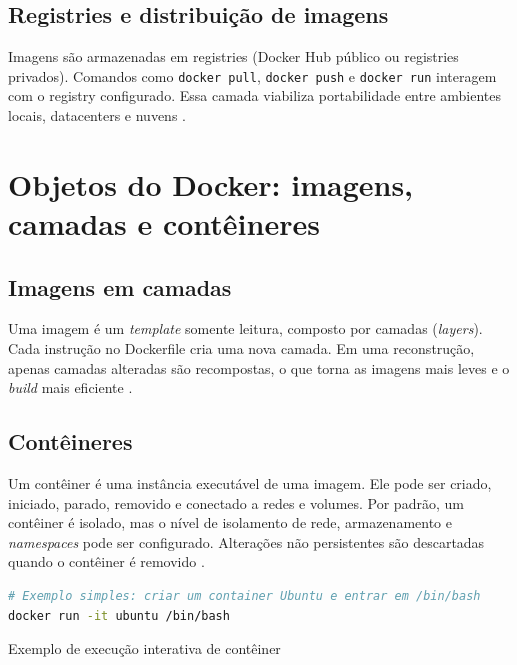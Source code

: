 \subsection{Registries e distribuição de imagens}
\label{subsec:docker-registries}

Imagens são armazenadas em registries (Docker Hub público ou registries privados). Comandos como \texttt{docker pull}, \texttt{docker push} e \texttt{docker run} interagem com o registry configurado. Essa camada viabiliza portabilidade entre ambientes locais, datacenters e nuvens \cite{docker_overview}. 

\section{Objetos do Docker: imagens, camadas e contêineres}
\label{sec:docker-objetos}

\subsection{Imagens em camadas}
\label{subsec:docker-imagens}

Uma imagem é um \textit{template} somente leitura, composto por camadas (\textit{layers}). Cada instrução no Dockerfile cria uma nova camada. Em uma reconstrução, apenas camadas alteradas são recompostas, o que torna as imagens mais leves e o \textit{build} mais eficiente \cite{docker_overview}. 

\subsection{Contêineres}
\label{subsec:docker-containers}

Um contêiner é uma instância executável de uma imagem. Ele pode ser criado, iniciado, parado, removido e conectado a redes e volumes. Por padrão, um contêiner é isolado, mas o nível de isolamento de rede, armazenamento e \textit{namespaces} pode ser configurado. Alterações não persistentes são descartadas quando o contêiner é removido \cite{docker_overview}. 

\begin{codigo}[H]
\begin{lstlisting}[language=bash]
# Exemplo simples: criar um container Ubuntu e entrar em /bin/bash
docker run -it ubuntu /bin/bash
\end{lstlisting}
\caption{Exemplo de execução interativa de contêiner}
\label{lst:docker-run}
\end{codigo}

